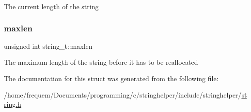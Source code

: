 The current length of the string \mbox{\label{structstring__t_aec6779bd44889730e24d6a682f3607f7}} 
\subsubsection{\texorpdfstring{maxlen}{maxlen}}
{\footnotesize\ttfamily unsigned int string\+\_\+t\+::maxlen}

The maximum length of the string before it has to be reallocated 

The documentation for this struct was generated from the following file\+:\begin{DoxyCompactItemize}
\item 
/home/frequem/\+Documents/programming/c/stringhelper/include/stringhelper/\mbox{\hyperlink{string_8h}{string.\+h}}\end{DoxyCompactItemize}
